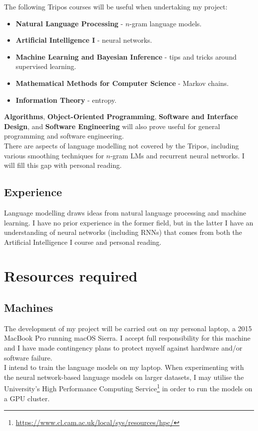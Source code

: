 \documentclass[a4paper, 12pt]{article}
\newcommand{\tbf}[1]{\textbf{#1}}
\newcommand{\hlink}[2]{{\href{#1}{#2}}}
\begin{document}
The following Tripos courses will be useful when undertaking my project:
\begin{itemize}
\item
	\tbf{Natural Language Processing} - $n$-gram language models.
\item
	\tbf{Artificial Intelligence I} - neural networks.
\item
	\tbf{Machine Learning and Bayesian Inference} - tips and tricks around supervised learning.
\item
	\tbf{Mathematical Methods for Computer Science} - Markov chains.
\item
	\tbf{Information Theory} - entropy.
\end{itemize}
\tbf{Algorithms}, \tbf{Object-Oriented Programming}, \tbf{Software and Interface Design}, and \tbf{Software Engineering} will also prove useful for general programming and software engineering. \\

\noindent
There are aspects of language modelling not covered by the Tripos, including various smoothing techniques for $n$-gram LMs and recurrent neural networks. I will fill this gap with personal reading.

\subsection*{Experience}
Language modelling draws ideas from natural language processing and machine learning. I have no prior experience in the former field, but in the latter I have an understanding of neural networks (including RNNs) that comes from both the Artificial Intelligence I course and personal reading. \\

\section*{Resources required}

\subsection*{Machines}
The development of my project will be carried out on my personal laptop, a 2015 MacBook Pro running macOS Sierra. I accept full responsibility for this machine and I have made contingency plans to protect myself against hardware and/or software failure. \\

\noindent
I intend to train the language models on my laptop. When experimenting with the neural network-based language models on larger datasets, I may utilise the University's High Performance Computing Service\footnote{\hlink{https://www.cl.cam.ac.uk/local/sys/resources/hpc/}{https://www.cl.cam.ac.uk/local/sys/resources/hpc/}} in order to run the models on a GPU cluster.
\end{document}

